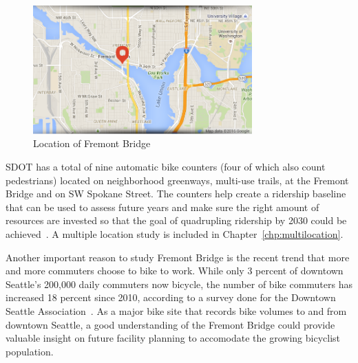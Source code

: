\documentclass [11pt, proquest] {uwthesis}[2015/03/03]
\begin{document}
\begin{figure}
\centering
   \includegraphics[width=0.75\textwidth]{figures/FremontBrdige} 
  \caption{Location of Fremont Bridge}
  \label{fig:fremont}
  \vspace{-1cm}
\end{figure}

SDOT has a total of nine automatic bike counters (four of which also count pedestrians) located on neighborhood greenways, multi-use trails, at the Fremont  Bridge and on SW Spokane Street. The counters help create a ridership baseline that can be used to assess future years and make sure the right amount of resources are invested so that the goal of quadrupling ridership by 2030 could be achieved~\cite{SDOT_BMP15}. A multiple location study is included in Chapter~\ref{chp:multilocation}.

Another important reason to study Fremont Bridge is the recent trend that more and more commuters choose to bike to work. While only 3 percent of downtown Seattle's 200,000 daily commuters now bicycle, the number of bike commuters has increased 18 percent since 2010, according to a survey done for the Downtown Seattle Association~\cite{downtown2013}. As a major bike site that records bike volumes to and from downtown Seattle, a good understanding of the Fremont Bridge could provide valuable insight on future facility planning to accomodate the growing bicyclist population. 
\end{document}
